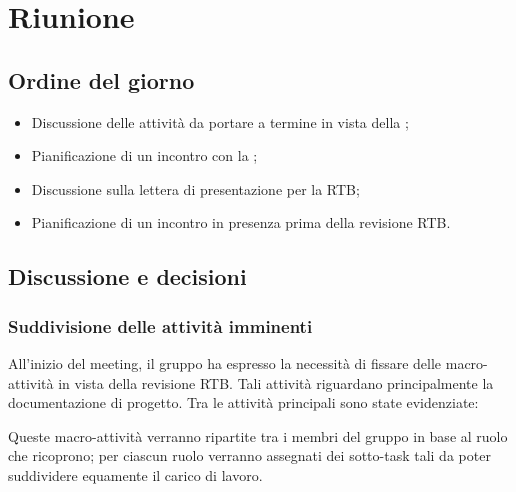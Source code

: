 \section{Riunione}
\subsection{Ordine del giorno}
\begin{itemize}
	\item Discussione delle attività da portare a termine in vista della ;
	\item Pianificazione di un incontro con la ;
	\item Discussione sulla lettera di presentazione per la RTB;
	\item Pianificazione di un incontro in presenza prima della revisione RTB.
\end{itemize}

\subsection{Discussione e decisioni}
\subsubsection{Suddivisione delle attività imminenti}
\par All'inizio del meeting, il gruppo ha espresso la necessità di fissare delle macro-attività in vista della revisione RTB. Tali attività riguardano principalmente la documentazione di progetto. 
Tra le attività principali sono state evidenziate:
\par Queste macro-attività verranno ripartite tra i membri del gruppo in base al ruolo che ricoprono; per ciascun ruolo verranno assegnati dei sotto-task tali da poter suddividere equamente il carico di lavoro.

